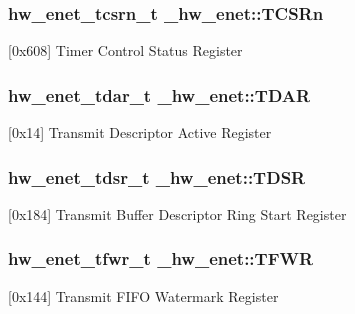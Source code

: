 \subsubsection[{\texorpdfstring{T\+C\+S\+Rn}{TCSRn}}]{ {\bf hw\+\_\+enet\+\_\+tcsrn\+\_\+t} \+\_\+hw\+\_\+enet\+::\+T\+C\+S\+Rn}\hypertarget{struct__hw__enet_a4c8d2d30c2f936260b8d36c6540e133f}{}\label{struct__hw__enet_a4c8d2d30c2f936260b8d36c6540e133f}
\mbox{[}0x608\mbox{]} Timer Control Status Register 
\subsubsection[{\texorpdfstring{T\+D\+AR}{TDAR}}]{ {\bf hw\+\_\+enet\+\_\+tdar\+\_\+t} \+\_\+hw\+\_\+enet\+::\+T\+D\+AR}\hypertarget{struct__hw__enet_ac7e0660e4bfc88b1e1d9ee99bab78f93}{}\label{struct__hw__enet_ac7e0660e4bfc88b1e1d9ee99bab78f93}
\mbox{[}0x14\mbox{]} Transmit Descriptor Active Register 
\subsubsection[{\texorpdfstring{T\+D\+SR}{TDSR}}]{ {\bf hw\+\_\+enet\+\_\+tdsr\+\_\+t} \+\_\+hw\+\_\+enet\+::\+T\+D\+SR}\hypertarget{struct__hw__enet_a55990574aee7dfde8201921dff88bda3}{}\label{struct__hw__enet_a55990574aee7dfde8201921dff88bda3}
\mbox{[}0x184\mbox{]} Transmit Buffer Descriptor Ring Start Register 
\subsubsection[{\texorpdfstring{T\+F\+WR}{TFWR}}]{ {\bf hw\+\_\+enet\+\_\+tfwr\+\_\+t} \+\_\+hw\+\_\+enet\+::\+T\+F\+WR}\hypertarget{struct__hw__enet_a36cf2fd7527ced27a4d23b4d59421edd}{}\label{struct__hw__enet_a36cf2fd7527ced27a4d23b4d59421edd}
\mbox{[}0x144\mbox{]} Transmit F\+I\+FO Watermark Register 
